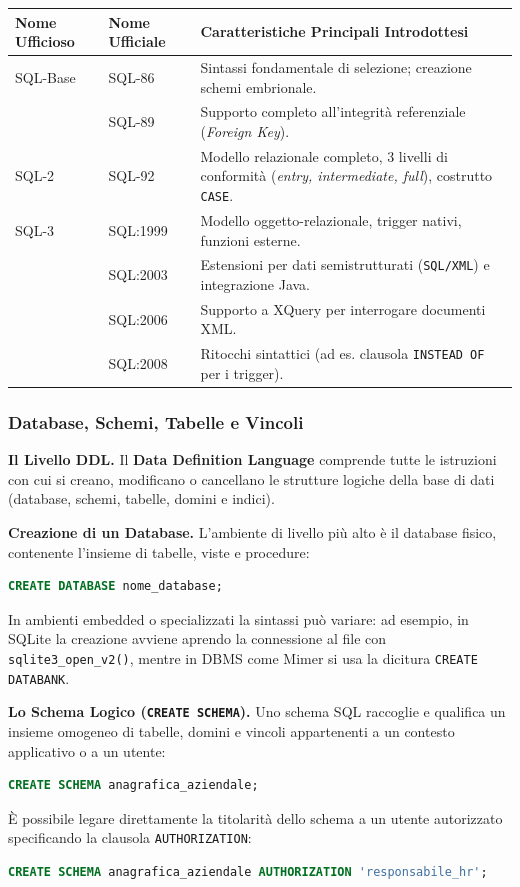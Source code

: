 \documentclass[12pt]{extarticle}
\begin{document}
\begin{center}
\small
\begin{tabular}{llp{9.2cm}}
    \toprule
    \textbf{Nome Ufficioso} & \textbf{Nome Ufficiale} & \textbf{Caratteristiche Principali Introdottesi} \\
    \midrule
    SQL-Base & SQL-86 & Sintassi fondamentale di selezione; creazione schemi embrionale. \\
    & SQL-89 & Supporto completo all'integrità referenziale (\textit{Foreign Key}). \\
    \addlinespace
    SQL-2 & SQL-92 & Modello relazionale completo, 3 livelli di conformità (\textit{entry, intermediate, full}), costrutto \texttt{CASE}. \\
    \addlinespace
    SQL-3 & SQL:1999 & Modello oggetto-relazionale, trigger nativi, funzioni esterne. \\
    & SQL:2003 & Estensioni per dati semistrutturati (\texttt{SQL/XML}) e integrazione Java. \\
    & SQL:2006 & Supporto a XQuery per interrogare documenti XML. \\
    & SQL:2008 & Ritocchi sintattici (ad es. clausola \texttt{INSTEAD OF} per i trigger). \\
    \bottomrule
\end{tabular}
\end{center}

\subsubsection{Database, Schemi, Tabelle e Vincoli}
\noindent \textbf{Il Livello DDL.} Il \textbf{Data Definition Language} comprende tutte le istruzioni con cui si creano, modificano o cancellano le strutture logiche della base di dati (database, schemi, tabelle, domini e indici).

\medskip
\noindent \textbf{Creazione di un Database.} L'ambiente di livello più alto è il database fisico, contenente l'insieme di tabelle, viste e procedure:
\begin{lstlisting}[language=SQL]
CREATE DATABASE nome_database;
\end{lstlisting}
In ambienti embedded o specializzati la sintassi può variare: ad esempio, in SQLite la creazione avviene aprendo la connessione al file con \texttt{sqlite3\_open\_v2()}, mentre in DBMS come Mimer si usa la dicitura \texttt{CREATE DATABANK}.

\medskip
\noindent \textbf{Lo Schema Logico (\texttt{CREATE SCHEMA}).} Uno schema SQL raccoglie e qualifica un insieme omogeneo di tabelle, domini e vincoli appartenenti a un contesto applicativo o a un utente:
\begin{lstlisting}[language=SQL]
CREATE SCHEMA anagrafica_aziendale;
\end{lstlisting}
È possibile legare direttamente la titolarità dello schema a un utente autorizzato specificando la clausola \texttt{AUTHORIZATION}:
\begin{lstlisting}[language=SQL]
CREATE SCHEMA anagrafica_aziendale AUTHORIZATION 'responsabile_hr';
\end{lstlisting}
\end{document}
